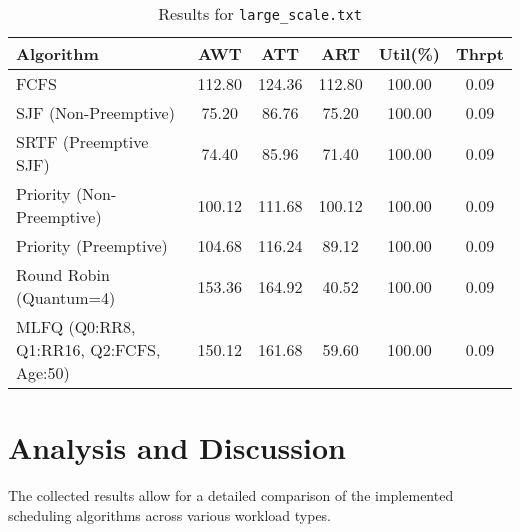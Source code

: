 \documentclass[12pt]{article}
\begin{document}
\begin{table}[htbp]
\centering
\caption{Results for \texttt{large\_scale.txt}}
\label{tab:large_results}
\footnotesize
\begin{tabular}{@{}l S[table-format=3.2] S[table-format=3.2] S[table-format=3.2] S[table-format=3.2] S[table-format=1.2]@{}}
\toprule
Algorithm                                     & {AWT} & {ATT} & {ART} & {Util(\%)} & {Thrpt}\\
\midrule
FCFS                                         & 112.80        & 124.36           & 112.80         & 100.00          & 0.09 \\
SJF (Non-Preemptive)                         & 75.20         & 86.76            & 75.20          & 100.00          & 0.09 \\
SRTF (Preemptive SJF)                        & 74.40         & 85.96            & 71.40          & 100.00          & 0.09 \\
Priority (Non-Preemptive)                    & 100.12        & 111.68           & 100.12         & 100.00          & 0.09 \\
Priority (Preemptive)                        & 104.68        & 116.24           & 89.12          & 100.00          & 0.09 \\
Round Robin (Quantum=4)                      & 153.36        & 164.92           & 40.52          & 100.00          & 0.09 \\
MLFQ (Q0:RR8, Q1:RR16, Q2:FCFS, Age:50)      & 150.12        & 161.68           & 59.60          & 100.00          & 0.09 \\
\bottomrule
\end{tabular}
\end{table}

\section{Analysis and Discussion}
The collected results allow for a detailed comparison of the implemented scheduling algorithms across various workload types.
\end{document}
